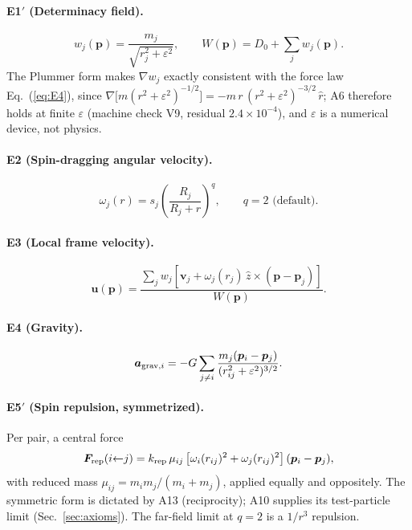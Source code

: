 \documentclass[aps,reprint,amsmath,amssymb,nofootinbib,superscriptaddress,floatfix]{revtex4-2}
\newcommand{\vect}[1]{\bm{#1}}
\newcommand{\Dz}{D_0}
\begin{document}
\paragraph*{E1$'$ (Determinacy field).}
\begin{equation}
w_j(\vect{p}) = \frac{m_j}{\sqrt{r_j^2+\varepsilon^2}},\qquad
W(\vect{p}) = \Dz + \sum_j w_j(\vect{p}).
\label{eq:E1}
\end{equation}
The Plummer form makes $\nabla w_j$ exactly consistent with the force
law Eq.~(\ref{eq:E4}), since
$\nabla\bigl[m(r^2+\varepsilon^2)^{-1/2}\bigr]
 = -m\,r\,(r^2+\varepsilon^2)^{-3/2}\,\hat{r}$; A6 therefore holds at
finite $\varepsilon$
(machine check V9, residual $2.4\times10^{-4}$), and $\varepsilon$ is
a numerical device, not physics.

\paragraph*{E2 (Spin-dragging angular velocity).}
\begin{equation}
\omega_j(r) = s_j\left(\frac{R_j}{R_j+r}\right)^{q},\qquad
q = 2 \text{ (default)}.
\label{eq:E2}
\end{equation}

\paragraph*{E3 (Local frame velocity).}
\begin{equation}
\vect{u}(\vect{p}) =
\frac{\sum_j w_j\left[\vect{v}_j
 + \omega_j(r_j)\,\hat{z}\times(\vect{p}-\vect{p}_j)\right]}
{W(\vect{p})}.
\label{eq:E3}
\end{equation}

\paragraph*{E4 (Gravity).}
\begin{equation}
\vect{a}_{{\rm grav},i} =
 -G\sum_{j\ne i} \frac{m_j(\vect{p}_i-\vect{p}_j)}
 {(r_{ij}^2+\varepsilon^2)^{3/2}}.
\label{eq:E4}
\end{equation}

\paragraph*{E5$'$ (Spin repulsion, symmetrized).}
Per pair, a central force
\begin{equation}
\vect{F}_{{\rm rep}}(i{\leftarrow}j) =
 k_{\rm rep}\,\mu_{ij}
 \left[\omega_i(r_{ij})^2+\omega_j(r_{ij})^2\right]
 (\vect{p}_i-\vect{p}_j),
\label{eq:E5}
\end{equation}
with reduced mass $\mu_{ij} = m_im_j/(m_i+m_j)$, applied equally and
oppositely.
The symmetric form is dictated by A13 (reciprocity); A10 supplies its
test-particle limit (Sec.~\ref{sec:axioms}).
The far-field limit at $q=2$ is a $1/r^3$ repulsion.
\end{document}
